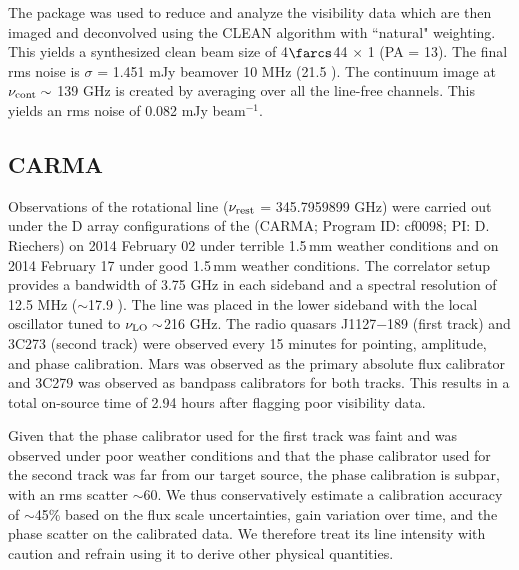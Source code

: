 \documentclass[]{emulateapj}
\begin{document}
The  package was used to reduce and analyze the visibility data
which are then imaged and deconvolved using the CLEAN algorithm with ``natural"
weighting. This yields a synthesized clean beam size of 4$\farcs$44 $\times$ 1 (PA = 13\degr).
The final rms noise is $\sigma$ = 1.451 mJy \kms
beam\pmOne over 10 MHz (21.5 \kms). The continuum image at $\nu_{\rm cont}\sim$
139 GHz is created by averaging over all the line-free channels. This
yields an rms noise of 0.082 mJy beam$^{-1}$. %

\subsection{CARMA \cco} %
Observations of the \cco rotational line ($\nu_{\rm rest}$ = 345.7959899 GHz)
were carried out under the D array configurations of the \carma (CARMA;
Program ID: cf0098; PI: D. Riechers) on 2014 February 02 under terrible 1.5\,mm
weather conditions and on 2014 February 17 under good 1.5\,mm
weather conditions. The correlator setup provides a bandwidth of 3.75 GHz in
each sideband and a spectral resolution of 12.5 MHz ($\sim$17.9 \kms). The
line was placed in the lower sideband with the local oscillator tuned to $\nu_{\rm LO}\sim$216 GHz. The radio quasars J1127$-$189 (first track) and 3C273
(second track) were observed
every 15 minutes for pointing, amplitude, and phase calibration. Mars was
observed as the primary absolute flux calibrator and 3C279 was observed as
bandpass calibrators for both tracks. This results in a total on-source time of 2.94 hours after flagging poor
visibility data.

%
Given that the phase calibrator used for the first track was faint and was
observed under poor weather conditions and that the phase calibrator used for
the second track was far from our target source, the phase calibration is
subpar, with an rms scatter $\sim$60\degr. We thus conservatively estimate
a calibration accuracy of $\sim$45\% based on the flux scale uncertainties,
gain variation over time, and the phase scatter on the calibrated data. We
therefore treat its line intensity with caution and refrain using it to derive other physical quantities.
\end{document}
